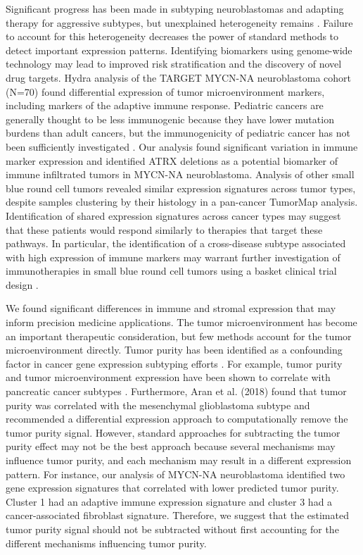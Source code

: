 \documentclass[10pt,letterpaper]{article}
\begin{document}
Significant progress has been made in subtyping neuroblastomas and adapting therapy for aggressive subtypes, but unexplained heterogeneity remains \cite{morgensternChallengeDefiningUltrahighrisk2019}. Failure to account for this heterogeneity decreases the power of standard methods to detect important expression patterns. Identifying biomarkers using genome-wide technology may lead to improved risk stratification and the discovery of novel drug targets. Hydra analysis of the TARGET MYCN-NA neuroblastoma cohort (N=70) found differential expression of tumor microenvironment markers, including markers of the adaptive immune response. Pediatric cancers are generally thought to be less immunogenic because they have lower mutation burdens than adult cancers, but the immunogenicity of pediatric cancer has not been sufficiently investigated \cite{majzner2017harnessing}. Our analysis found significant variation in immune marker expression and identified ATRX deletions as a potential biomarker of immune infiltrated tumors in MYCN-NA neuroblastoma. Analysis of other small blue round cell tumors revealed similar expression signatures across tumor types, despite samples clustering by their histology in a pan-cancer TumorMap analysis. Identification of shared expression signatures across cancer types may suggest that these patients would respond similarly to therapies that target these pathways. In particular, the identification of a cross-disease subtype associated with high expression of immune markers may warrant further investigation of immunotherapies in small blue round cell tumors using a basket clinical trial design \cite{cunananEfficientBasketTrial2017}.

We found significant differences in immune and stromal expression that may inform precision medicine applications. The tumor microenvironment has become an important therapeutic consideration, but few methods account for the tumor microenvironment directly. Tumor purity has been identified as a confounding factor in cancer gene expression subtyping efforts \cite{rheeImpactTumorPurity2018}. For example, tumor purity and tumor microenvironment expression have been shown to correlate with pancreatic cancer subtypes \cite{raphael2017integrated}. Furthermore, Aran et al. (2018) found that tumor purity was correlated with the mesenchymal glioblastoma subtype and recommended a differential expression approach to computationally remove the tumor purity signal. However, standard approaches for subtracting the tumor purity effect may not be the best approach because several mechanisms may influence tumor purity, and each mechanism may result in a different expression pattern. For instance, our analysis of MYCN-NA neuroblastoma identified two gene expression signatures that correlated with lower predicted tumor purity. Cluster 1 had an adaptive immune expression signature and cluster 3 had a cancer-associated fibroblast signature. Therefore, we suggest that the estimated tumor purity signal should not be subtracted without first accounting for the different mechanisms influencing tumor purity.
\end{document}
